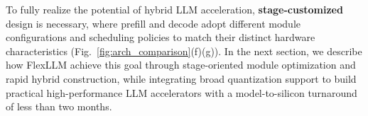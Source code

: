 \documentclass[conference]{IEEEtran}
\begin{document}
To fully realize the potential of hybrid LLM acceleration, \textbf{stage-customized} design is necessary, where prefill and decode adopt different module configurations and scheduling policies to match their distinct hardware characteristics (Fig.~\ref{fig:arch_comparison}(f)(g)). In the next section, we describe how FlexLLM achieve this goal through stage-oriented module optimization and rapid hybrid construction, while integrating broad quantization support to build practical high-performance LLM accelerators with a model-to-silicon turnaround of less than two months.








\end{document}
